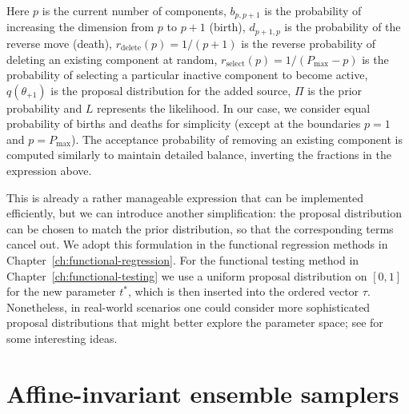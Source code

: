 Here \(p\) is the current number of components, \(b_{p, p+1}\) is the probability of increasing the dimension from \(p\) to \(p+1\) (birth), \(d_{p+1, p}\) is the probability of the reverse move (death), \(r_{\text{delete}}(p)=1/(p+1)\) is the reverse probability of deleting an existing component at random, \(r_{\text{select}}(p)=1/(P_{\max} - p)\) is the probability of selecting a particular inactive component to become active, \(q(\theta_{+1})\) is the proposal distribution for the added source, \(\Pi\) is the prior probability and \(L\) represents the likelihood. In our case, we consider equal probability of births and deaths for simplicity (except at the boundaries \(p=1\) and \(p=P_{\max}\)). The acceptance probability of removing an existing component is computed similarly to maintain detailed balance, inverting the fractions in the expression above.

This is already a rather manageable expression that can be implemented efficiently, but we can introduce another simplification: the proposal distribution can be chosen to match the prior distribution, so that the corresponding terms cancel out. We adopt this formulation in the functional regression methods in Chapter~\ref{ch:functional-regression}. For the functional testing method in Chapter~\ref{ch:functional-testing} we use a uniform proposal distribution on \([0,1]\) for the new parameter \(t^*\), which is then inserted into the ordered vector \(\tau\).  Nonetheless, in real-world scenarios one could consider more sophisticated proposal distributions that might better explore the parameter space; see \citet{davies2023transport} for some interesting ideas.

\section{Affine-invariant ensemble samplers}\label{sec:affine-invariant-samplers}

